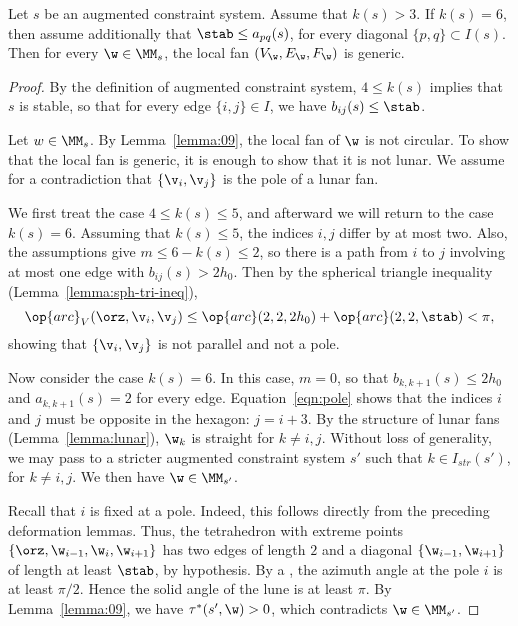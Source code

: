
\begin{lemma} Let $s$ be an augmented constraint system.
Assume that $k(s)>3$.
If $k(s)=6$, then assume additionally that
$\stab\le a_{pq}(s)$, for every diagonal $\{p,q\}\subset I(s)$.
Then for every  $\w\in\MM_s$,  the local fan $(V_\w,E_\w,F_\w)$ is generic.
\end{lemma}

\begin{proof}
By the definition of augmented constraint system, $4\le k(s)$ implies
that $s$ is stable, so that for every edge $\{i,j\}\in I$, we have
$b_{i j}(s) \le\stab$.

Let $w\in \MM_s$.  By Lemma~\ref{lemma:09}, the local fan of $\w$  is not circular.
To show that the local fan is generic, it is enough to show that it is not lunar.
We assume for a contradiction that $\{\v_i,\v_j\}$ is the pole of a lunar fan.

We first treat the case  $4\le k(s)\le 5$,
and afterward we will return to the case $k(s)=6$. 
Assuming that  $k(s)\le 5$, the indices $i,j$ differ by at most two.
Also, the assumptions give $m\le 6-k(s)\le 2$, so there is a path from
$i$ to $j$ involving at most one edge with $b_{i j}(s)>2h_0$.
Then by the spherical triangle inequality (Lemma~\ref{lemma:sph-tri-ineq}),
\begin{equation}\label{eqn:pole}
\op{arc}_V(\orz,\v_i,\v_j) \le \op{arc}(2,2,2h_0) + \op{arc}(2,2,\stab) < \pi,
\end{equation}
showing that $\{\v_i,\v_j\}$ is not parallel and not a pole.

Now consider the case $k(s)=6$.  In this case, $m=0$, so that $b_{k,k+1}(s)\le 2h_0$
and $a_{k,k+1}(s)=2$
for every edge. Equation~\ref{eqn:pole} shows that the indices $i$ and $j$
must be opposite in the hexagon: $j = i+3$.  By the structure of lunar fans
(Lemma~\ref{lemma:lunar}), $\w_k$ is straight for $k\ne i,j$.  Without
loss of generality, we may
pass to a stricter augmented constraint system $s'$ such that
$k\in I_{str}(s')$, for $k\ne i,j$.  We then have $\w\in \MM_{s'}$.

Recall that $i$ is fixed at a pole. 
  Indeed, this follows directly from the preceding deformation
lemmas.  Thus, the tetrahedron with extreme points
$\{\orz,\w_{i-1},\w_i,\w_{i+1}\}$ has two edges
of length $2$ and a diagonal $\{\w_{i-1},\w_{i+1}\}$ of length at least
$\stab$, by hypothesis.  By a , 
the azimuth angle at the pole $i$ is at least $\pi/2$.
Hence the solid angle of the lune is at least $\pi$.  By Lemma~\ref{lemma:09},
we have $\tau^*(s',\w)>0$, which contradicts $\w\in \MM_{s'}$.
\end{proof}


